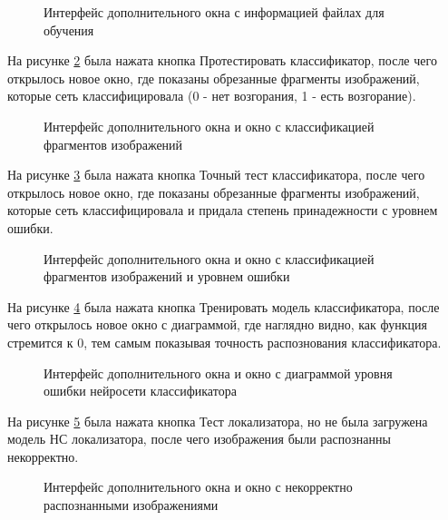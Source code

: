 \begin{figure}[H]
\caption{Интерфейс дополнительного окна с информацией файлах для обучения}
\label{systemtest14:image}
\end{figure}

На рисунке \ref{systemtest15:image} была нажата кнопка Протестировать классификатор, после чего открылось новое окно, где показаны обрезанные фрагменты изображений, которые сеть классифицировала (0 - нет возгорания, 1 - есть возгорание).

\begin{figure}[H]
\caption{Интерфейс дополнительного окна и окно с классификацией фрагментов изображений}
\label{systemtest15:image}
\end{figure}

На рисунке \ref{systemtest16:image} была нажата кнопка Точный тест классификатора, после чего открылось новое окно, где показаны обрезанные фрагменты изображений, которые сеть классифицировала и придала степень принадежности с уровнем ошибки.

\begin{figure}[H]
\caption{Интерфейс дополнительного окна и окно с классификацией фрагментов изображений и уровнем ошибки}
\label{systemtest16:image}
\end{figure}

На рисунке \ref{systemtest17:image} была нажата кнопка Тренировать модель классификатора, после чего открылось новое окно с диаграммой, где наглядно видно, как функция стремится к 0, тем самым показывая точность распознования классификатора.

\begin{figure}[H]
\caption{Интерфейс дополнительного окна и окно с диаграммой уровня ошибки нейросети классификатора}
\label{systemtest17:image}
\end{figure}

На рисунке \ref{systemtest18:image} была нажата кнопка Тест локализатора, но не была загружена модель НС локализатора, после чего изображения были распознанны некорректно.

\begin{figure}[H]
\caption{Интерфейс дополнительного окна и окно с некорректно распознанными изображениями}
\label{systemtest18:image}
\end{figure}

